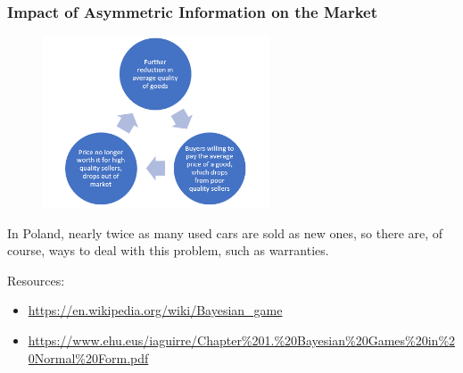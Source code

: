 \documentclass[11pt]{beamer}
\begin{document}
\begin{frame}
    \frametitle{Impact of Asymmetric Information on the Market}

    \begin{figure}
        \centering
        \includegraphics[width=0.6\textwidth]{assets/cycle_of_market.png}
    \end{figure}


    In Poland, nearly twice as many used cars are sold as new ones, so there are, of course, ways to deal with this problem, such as warranties.

    
\end{frame}



\begin{frame}

    Resources:
    \begin{itemize}
        \item \url{https://en.wikipedia.org/wiki/Bayesian_game}
        \item \url{https://www.ehu.eus/iaguirre/Chapter\%201.\%20Bayesian\%20Games\%20in\%20Normal\%20Form.pdf}
    \end{itemize}
    
\end{frame}
\end{document}
